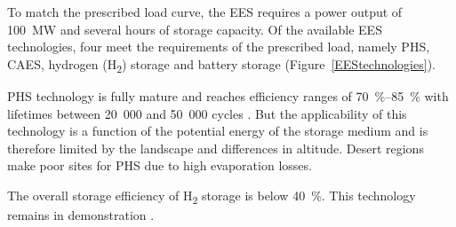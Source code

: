 To match the prescribed load curve, the \ac{EES} requires a power output of \SI{100}{\mega\watt} and several hours of storage capacity. Of the available \ac{EES} technologies, four meet the requirements of the prescribed load, namely \acf{PHS}, \acf{CAES}, hydrogen (H\textsubscript{2}) storage and battery storage (Figure~\ref{EEStechnologies}).


\ac{PHS} technology is fully mature and reaches efficiency ranges of \SIrange{70}{85}{\percent} with lifetimes between 20~000 and 50~000 cycles \cite{IEA2014c}. But the applicability of this technology is a function of the potential energy of the storage medium and is therefore limited by the landscape and differences in altitude. Desert regions make poor sites for \ac{PHS} due to high evaporation losses.

The overall storage efficiency of H\textsubscript{2} storage is below \SI{40}{\percent}. This technology remains in demonstration \cite{IEA2014c,IEA2015}.

